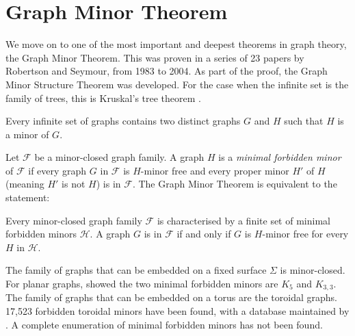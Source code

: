 \section{Graph Minor Theorem}\label{sec:Graph Minor Theorem}
We move on to one of the most important and deepest theorems in graph theory, the Graph Minor Theorem. This was proven in a series of 23 papers by Robertson and Seymour, from 1983 to 2004. As part of the proof, the Graph Minor Structure Theorem was developed. For the case when the infinite set is the family of trees, this is Kruskal's tree theorem \cite{kruskalWellQuasiOrderingTreeTheorem1960}. 
\begin{theorem}
	Every infinite set of graphs contains two distinct graphs \(G\) and \(H\) such that \(H\) is a minor of \(G\).
\end{theorem}
Let $\mathcal{F}$ be a minor-closed graph family. A graph $H$ is a \textit{minimal forbidden minor} of $\mathcal{F}$ if every graph $G$ in $\mathcal{F}$ is $H$-minor free and every proper minor $H'$ of $H$ (meaning $H'$ is not $H$) is in $\mathcal{F}$. 
The Graph Minor Theorem is equivalent to the statement:
\begin{theorem}
	Every minor-closed graph family $\mathcal{F}$ is characterised by a finite set of minimal forbidden minors $\mathcal{H}$. A graph $G$ is in $\mathcal{F}$ if and only if $G$ is $H$-minor free for every $H$ in $\mathcal{H}$. 
\end{theorem}
The family of graphs that can be embedded on a fixed surface $\Sigma$ is minor-closed. 
For planar graphs, \textcite{wagnerUeberEigenschaftEbenen1937} showed the two minimal forbidden minors are \(K_5\) and \(K_{3,3}\). 
The family of graphs that can be embedded on a torus are the toroidal graphs. 17,523 forbidden toroidal minors have been found, with a database maintained by \textcite{myrvoldLargeSetTorus2018}. A complete enumeration of minimal forbidden minors has not been found. 

